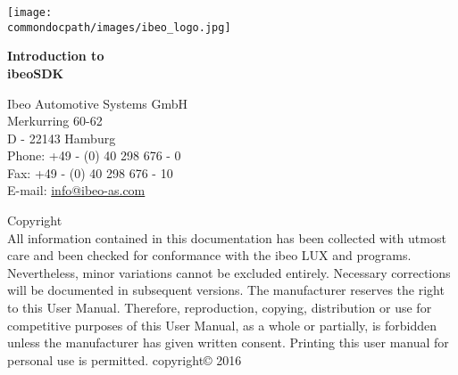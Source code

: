 \newpage
{}
\thispagestyle{plain}

\begin{center}
\vspace*{3cm}
\texttt{[image: \\commondocpath/images/ibeo\_logo.jpg]}
\vspace*{\fill}
\end{center}

\newpage



\thispagestyle{plain}
\vspace*{6cm}
\begin{bfseries}
\begin{huge}
\huge \bfseries \noindent Introduction to\\ [1.5cm]
\huge \bfseries ibeoSDK
\end{huge}
\end{bfseries}
\newpage
\thispagestyle{plain}

\newpage
\begin{bfseries} 
\null
\vfill
\begin{centering}Ibeo Automotive Systems GmbH\\
Merkurring 60-62\\
D - 22143 Hamburg\\
Phone: +49 - (0) 40 298 676 - 0\\
Fax: +49 - (0) 40 298 676 - 10\\
E-mail: \href{mailto:info@ibeo-as.com}{info@ibeo-as.com}
\vspace*{1.0cm}
 
Copyright\\
\mdseries 
All information contained in this documentation has been collected with utmost care and been checked for conformance with the ibeo LUX and programs. Nevertheless, minor variations cannot be excluded entirely. Necessary corrections will be documented in subsequent versions. The manufacturer reserves the right to this User Manual. Therefore, reproduction, copying, distribution or use for competitive purposes of this User Manual, as a whole or partially, is forbidden unless the manufacturer has given written consent.
Printing this user manual for personal use is permitted.
copyright© 2016
\end{centering}
\end{bfseries}

